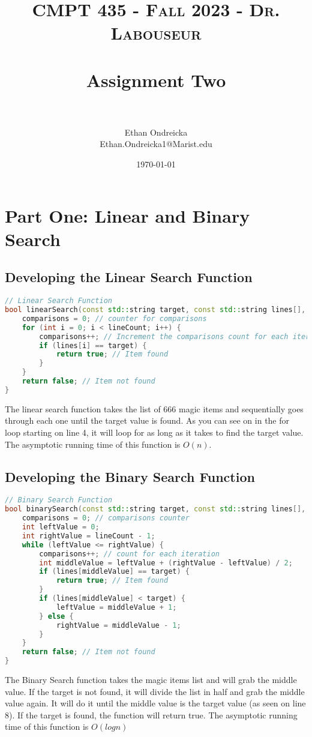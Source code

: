 \documentclass[letterpaper, 10pt,DIV=13]{scrartcl}
\title{	
   \normalfont \normalsize 
   \textsc{CMPT 435 - Fall 2023 - Dr. Labouseur} \\[10pt] %
   \horrule{0.5pt} \\[0.25cm] 	%
   \huge Assignment Two  \\     	    %
   \horrule{0.5pt} \\[0.25cm] 	%
}
\author{Ethan Ondreicka \\ \normalsize Ethan.Ondreicka1@Marist.edu}
\date{\normalsize\today} 	%
\numberwithin{equation}{section} %
\numberwithin{figure}{section} %
\numberwithin{table}{section} %
\begin{document}
\maketitle %

\section{Part One: Linear and Binary Search}

\subsection{Developing the Linear Search Function}

\begin{lstlisting}[language=c++, caption= Construction of the Linear Search Function]
// Linear Search Function
bool linearSearch(const std::string target, const std::string lines[], int lineCount, int& comparisons) {
    comparisons = 0; // counter for comparisons
    for (int i = 0; i < lineCount; i++) {
        comparisons++; // Increment the comparisons count for each iteration
        if (lines[i] == target) {
            return true; // Item found
        }
    }
    return false; // Item not found
}
\end{lstlisting}
The linear search function takes the list of 666 magic items and sequentially goes through each one until the target value is found. As you can see on in the for loop starting on line 4, it will loop for as long as it takes to find the target value. The asymptotic running time of this function is $O(n)$.
\subsection{Developing the Binary Search Function}
\begin{lstlisting}[language=c++, caption= Creation of the Binary Search Function]
// Binary Search Function
bool binarySearch(const std::string target, const std::string lines[], int lineCount, int& comparisons) {
    comparisons = 0; // comparisons counter
    int leftValue = 0;
    int rightValue = lineCount - 1;
    while (leftValue <= rightValue) {
        comparisons++; // count for each iteration
        int middleValue = leftValue + (rightValue - leftValue) / 2;
        if (lines[middleValue] == target) {
            return true; // Item found
        }
        if (lines[middleValue] < target) {
            leftValue = middleValue + 1;
        } else {
            rightValue = middleValue - 1;
        }
    }
    return false; // Item not found
}
\end{lstlisting}
The Binary Search function takes the magic items list and will grab the middle value. If the target is not found, it will divide the list in half and grab the middle value again. It will do it until the middle value is the target value (as seen on line 8). If the target is found, the function will return true. The asymptotic running time of this function is $O(logn)$
\end{document}
